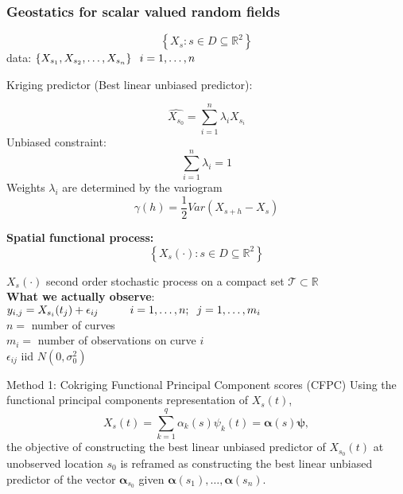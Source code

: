 \documentclass{beamer}
\newcommand{\Real}{\ensuremath{ \mathbb{R} }}
\newcommand{\balpha}{\boldsymbol\alpha}
\begin{document}
\frame
{
\frametitle{Geostatics for scalar valued random fields}
\[
	 \left\{  X_s: s \in D  \subseteq \Real^2\right\}
\]
data: $\left\{ X_{s_1}, X_{s_2}, \dots, X_{s_n} \right\} \hspace{0.2cm} i = 1, \dots, n$

Kriging predictor (Best linear unbiased predictor):

\[
\widehat{X_{s_0}} = \sum_{i=1}^n \lambda_i X_{s_i}
\]
Unbiased constraint:
\[
\sum_{i=1}^n \lambda_i = 1
\]
Weights $\lambda_i$ are determined by the variogram
\[
\gamma(h) = \frac{1}{2}Var(X_{s+h} -X_s)
\]
}

\frame
{
  \textbf{Spatial functional process:}\\
	\[
	 \left\{ X_s(\cdot): s \in D  \subseteq \Real^2\right\}
	 \]

	$X_s(\cdot)$ second order stochastic process on a compact set $\mathcal{T} \subset \Real$\\[0.2cm]

	\textbf{What we actually observe}:\\[0.2cm]

	$y_{i,j} = X_{s_i}(t_j) + \epsilon_{ij} \hspace{1cm} i = 1,\dots, n; \hspace{0.2cm} j = 1,\dots, m_i$\\[0.3cm]

	$n =$ number of curves\\
	$m_i=$ number of observations on curve $i$\\
	$\epsilon_{ij}$ iid $N(0, \sigma_0^2)$
}


\begin{frame}[t]{Method 1: Cokriging Functional Principal Component scores (CFPC)}
	Using the functional principal components representation of $X_s(t)$,
	\begin{equation*}
		X_{s}(t) = \sum_{k=1}^{q} \alpha_k(s)\psi_k(t) = \boldsymbol{\alpha}(s)\boldsymbol{\psi}, 
	\end{equation*}
	the objective of constructing the best linear unbiased predictor of $X_{s_0}(t)$ at unobserved location $s_0$ is reframed as constructing the best linear unbiased predictor of the vector $\balpha_{s_0}$ given $\balpha(s_1), \dots, \balpha(s_n)$. 
\end{frame}
\end{document}
